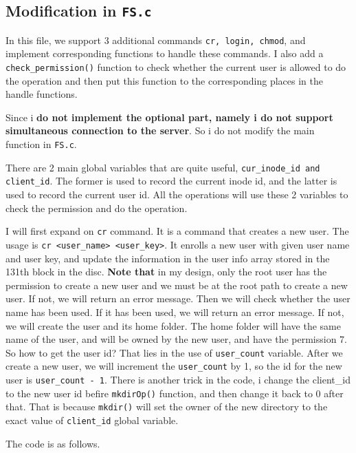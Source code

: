 \subsection{Modification in \texttt{FS.c}}
In this file, we support 3 additional commands \texttt{cr, login, chmod}, and implement 
corresponding functions to handle these commands. I also add a \texttt{check\_permission()} function to 
check whether the current user is allowed to do the operation and then put this function to the corresponding places in the handle functions.

Since i \textbf{do not implement the optional part, namely i do not support simultaneous connection to the server}. So i do not modify the main function in \texttt{FS.c}.

There are 2 main global variables that are quite useful, \texttt{cur_inode_id and client_id}. The former is used to record the current inode id, and the latter is used to record the current user id. 
All the operations will use these 2 variables to check the permission and do the operation.

I will first expand on \texttt{cr} command. It is a command that creates a new user. The usage is \texttt{cr <user\_name> <user\_key>}. It 
enrolls a new user with given user name and user key, and update the information in the user info array stored in the 131th block in the disc.
\textbf{Note that} in my design, only the root user has the permission to create a new user and we must be at the root path to create a new user. If not, we will return an error message.
Then we will check whether the user name has been used. If it has been used, we will return an error message. If not, we will create the user and its home folder. The home folder will have the same name of the user,
and will be owned by the new user, and have the permission 7. So how to get the user id? That lies in the use of \texttt{user\_count} variable. 
After we create a new user, we will increment the \texttt{user\_count} by 1, so the id for the new user is \texttt{user\_count - 1}. 
There is another trick in the code, i change the client_id to the new user id befire \texttt{mkdirOp()} function, and then change it back to 0 after that.
That is because \texttt{mkdir()} will set the owner of the new directory to the exact value of \texttt{client_id} global variable.

The code is as follows.

